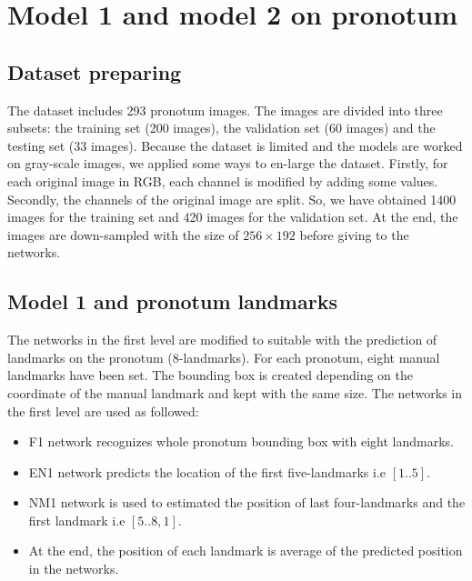 \section{Model 1 and model 2 on pronotum}
\subsection{Dataset preparing}
The dataset includes 293 pronotum images. The images are divided into three subsets: the training set (200 images), the validation set (60 images) and the testing set (33 images). Because the dataset is limited and the models are worked on gray-scale images, we applied some ways to en-large the dataset. Firstly, for each original image in RGB, each channel is modified by adding some values. Secondly, the channels of the original image are split. So, we have obtained 1400 images for the training set and 420 images for the validation set. At the end, the images are down-sampled with the  size of $256 \times 192$ before giving to the networks.

\subsection{Model 1 and pronotum landmarks}
The networks in the first level are modified to suitable with the prediction of landmarks on the pronotum (8-landmarks). For each pronotum, eight manual landmarks have been set. The bounding box is created depending on the coordinate of the manual landmark and kept with the same size. The networks in the first level are used as followed:
\begin{itemize}
	\item F1 network recognizes whole pronotum bounding box with eight landmarks.
	\item EN1 network predicts the location of the first five-landmarks i.e $[1..5]$.
	\item NM1 network is used to estimated the position of last four-landmarks and the first landmark i.e $[5..8,1]$.
	\item At the end, the position of each landmark is average of the predicted position in the networks.
\end{itemize} 
